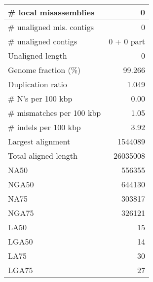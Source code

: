 \documentclass[12pt,a4paper]{article}
\begin{document}
\begin{table}[ht]
\begin{center}
\begin{tabular}{|l*{1}{|r}|}
\# local misassemblies & 0 \\ \hline
\# unaligned mis. contigs & 0 \\ \hline
\# unaligned contigs & 0 + 0 part \\ \hline
Unaligned length & 0 \\ \hline
Genome fraction (\%) & 99.266 \\ \hline
Duplication ratio & 1.049 \\ \hline
\# N's per 100 kbp & 0.00 \\ \hline
\# mismatches per 100 kbp & 1.05 \\ \hline
\# indels per 100 kbp & 3.92 \\ \hline
Largest alignment & 1544089 \\ \hline
Total aligned length & 26035008 \\ \hline
NA50 & 556355 \\ \hline
NGA50 & 644130 \\ \hline
NA75 & 303817 \\ \hline
NGA75 & 326121 \\ \hline
LA50 & 15 \\ \hline
LGA50 & 14 \\ \hline
LA75 & 30 \\ \hline
LGA75 & 27 \\ \hline
\end{tabular}
\end{center}
\end{table}
\end{document}
